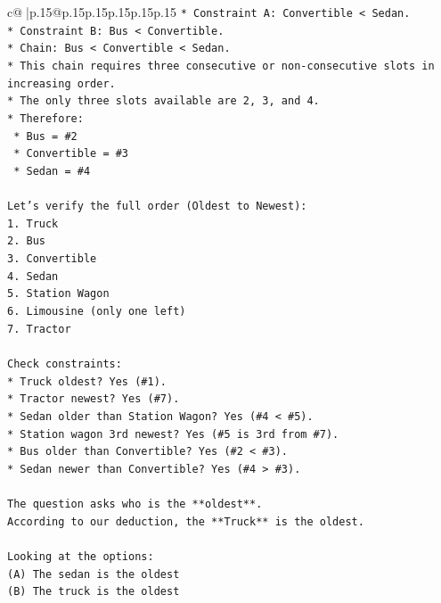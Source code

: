 \documentclass{article}
\begin{document}
{\begin{supertabular}{c@{$\;$}|p{.15\linewidth}@{}p{.15\linewidth}p{.15\linewidth}p{.15\linewidth}p{.15\linewidth}p{.15\linewidth}}
{{{\texttt{*   Constraint A: Convertible < Sedan.} \\
\texttt{*   Constraint B: Bus < Convertible.} \\
\texttt{*   Chain: Bus < Convertible < Sedan.} \\
\texttt{*   This chain requires three consecutive or non{-}consecutive slots in increasing order.} \\
\texttt{*   The only three slots available are 2, 3, and 4.} \\
\texttt{*   Therefore:} \\
\texttt{    *   Bus = \#2} \\
\texttt{    *   Convertible = \#3} \\
\texttt{    *   Sedan = \#4} \\
\\ 
\texttt{Let's verify the full order (Oldest to Newest):} \\
\texttt{1.  Truck} \\
\texttt{2.  Bus} \\
\texttt{3.  Convertible} \\
\texttt{4.  Sedan} \\
\texttt{5.  Station Wagon} \\
\texttt{6.  Limousine (only one left)} \\
\texttt{7.  Tractor} \\
\\ 
\texttt{Check constraints:} \\
\texttt{*   Truck oldest? Yes (\#1).} \\
\texttt{*   Tractor newest? Yes (\#7).} \\
\texttt{*   Sedan older than Station Wagon? Yes (\#4 < \#5).} \\
\texttt{*   Station wagon 3rd newest? Yes (\#5 is 3rd from \#7).} \\
\texttt{*   Bus older than Convertible? Yes (\#2 < \#3).} \\
\texttt{*   Sedan newer than Convertible? Yes (\#4 > \#3).} \\
\\ 
\texttt{The question asks who is the **oldest**.} \\
\texttt{According to our deduction, the **Truck** is the oldest.} \\
\\ 
\texttt{Looking at the options:} \\
\texttt{(A) The sedan is the oldest} \\
\texttt{(B) The truck is the oldest} \\
}}}
\end{supertabular}}
\end{document}
